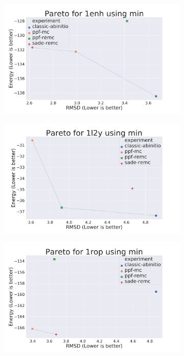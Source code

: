 \begin{figure}
\begin{subfigure}{0.49\linewidth}
  \end{subfigure}
%
  \begin{subfigure}{0.49\linewidth}
    \includegraphics[width=1\linewidth]{Figuras/pareto/1enh_best_by_rmsd_min.pdf}
  \end{subfigure}
%
  \begin{subfigure}{0.49\linewidth}
    \includegraphics[width=1\linewidth]{Figuras/pareto/1l2y_best_by_rmsd_min.pdf}
  \end{subfigure}
%
  \begin{subfigure}{0.49\linewidth}
    \includegraphics[width=1\linewidth]{Figuras/pareto/1rop_best_by_rmsd_min.pdf}

\end{subfigure}
\end{figure}
